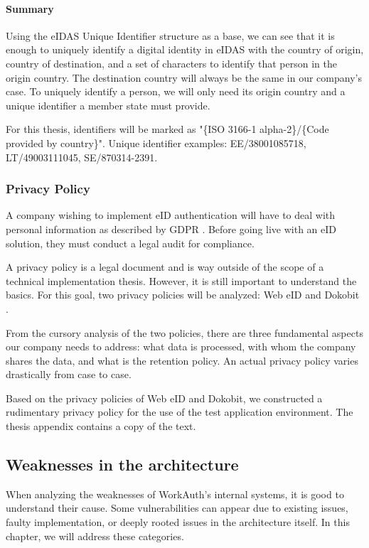 \paragraph{Summary} Using the eIDAS Unique Identifier structure as a base, we can see that it is enough to uniquely identify a digital identity in eIDAS with the country of origin, country of destination, and a set of characters to identify that person in the origin country. The destination country will always be the same in our company's case. To uniquely identify a person, we will only need its origin country and a unique identifier a member state must provide.

For this thesis, identifiers will be marked as "{\{ISO 3166-1 alpha-2\}}/{\{Code provided by country\}}". Unique identifier examples: EE/38001085718, LT/49003111045, SE/870314-2391.

\subsubsection{Privacy Policy}

A company wishing to implement eID authentication will have to deal with personal information as described by GDPR \cite{eulaw-gdpr}. Before going live with an eID solution, they must conduct a legal audit for compliance.

A privacy policy is a legal document and is way outside of the scope of a technical implementation thesis. However, it is still important to understand the basics. For this goal, two privacy policies will be analyzed: Web eID \cite{legal-webeid-privacypolicy} and Dokobit \cite{legal-dokobit-privacypolicy}.

From the cursory analysis of the two policies, there are three fundamental aspects our company needs to address: what data is processed, with whom the company shares the data, and what is the retention policy. An actual privacy policy varies drastically from case to case.

Based on the privacy policies of Web eID and Dokobit, we constructed a rudimentary privacy policy for the use of the test application environment. The thesis appendix contains a copy of the text.

\subsection{Weaknesses in the architecture}

When analyzing the weaknesses of WorkAuth's internal systems, it is good to understand their cause. Some vulnerabilities can appear due to existing issues, faulty implementation, or deeply rooted issues in the architecture itself. In this chapter, we will address these categories.

